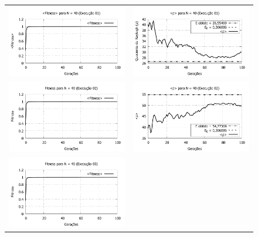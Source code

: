 \begin{figure}[htbp]
\centering
  \begin{tabular}{@{}cc@{}}
    \includegraphics[width=.45\textwidth]{figs/resultados/fitnessGrad/N40_01_fitness.pdf} &
    \includegraphics[width=.45\textwidth]{figs/resultados/fitnessGrad/N40_01_rho.pdf}   \\
		\includegraphics[width=.45\textwidth]{figs/resultados/fitnessGrad/N40_02_fitness.pdf} &
    \includegraphics[width=.45\textwidth]{figs/resultados/fitnessGrad/N40_02_rho.pdf}   \\
		\includegraphics[width=.45\textwidth]{figs/resultados/fitnessGrad/N40_03_fitness.pdf} &

\end{tabular}
\end{figure}
